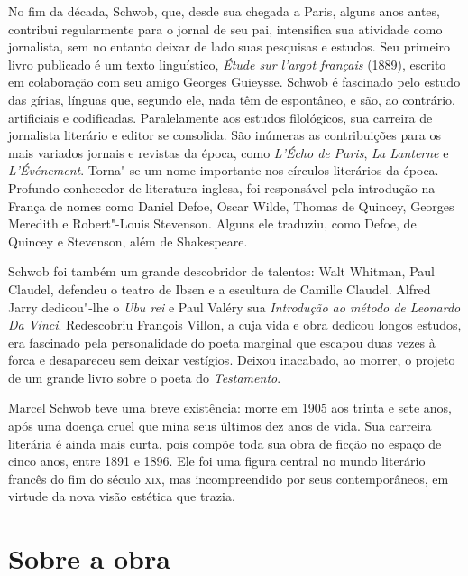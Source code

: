 
No fim da década, Schwob, que, desde sua chegada a Paris, alguns anos antes,
contribui regularmente para o jornal de seu pai, intensifica sua atividade como
jornalista, sem no entanto deixar de lado suas pesquisas e estudos. Seu
primeiro livro publicado é um texto linguístico, \textit{Étude sur l’argot
français} (1889), escrito em colaboração com seu amigo Georges Guieysse. Schwob
é fascinado pelo estudo das gírias, línguas que, segundo ele, nada têm de
espontâneo, e são, ao contrário, artificiais e codificadas. Paralelamente aos
estudos filológicos, sua carreira de jornalista literário e editor se
consolida. São inúmeras as contribuições para os mais variados jornais e
revistas da época, como \textit{L’Écho de Paris}, \textit{La Lanterne} e
\textit{L’Événement}. Torna"-se um nome importante nos círculos literários da
época. Profundo conhecedor de literatura inglesa, foi responsável pela
introdução na França de nomes como Daniel Defoe, Oscar Wilde, Thomas de
Quincey, Georges Meredith e Robert"-Louis Stevenson. Alguns ele traduziu, como
Defoe, de Quincey e Stevenson, além de Shakespeare.

Schwob foi também um grande descobridor de talentos: Walt Whitman, Paul
Claudel, defendeu o teatro de Ibsen e a escultura de Camille Claudel. Alfred
Jarry dedicou"-lhe o \textit{Ubu rei} e Paul Valéry sua \textit{Introdução ao
método de Leonardo Da Vinci}. Redescobriu François Villon, a cuja vida e obra
dedicou longos estudos, era fascinado pela personalidade do poeta marginal que
escapou duas vezes à forca e desapareceu sem deixar vestígios. Deixou
inacabado, ao morrer, o projeto de um grande livro sobre o poeta do
\textit{Testamento}.

Marcel Schwob teve uma breve existência: morre em 1905 aos trinta e sete
anos, após uma doença cruel que mina seus últimos dez anos de vida. Sua
carreira literária é ainda mais curta, pois compõe toda sua obra de ficção no
espaço de cinco anos, entre 1891 e 1896. Ele foi uma figura central no mundo
literário francês do fim do século \textsc{xix}, mas incompreendido por seus
contemporâneos, em virtude da nova visão estética que trazia.

\section{Sobre a obra}

